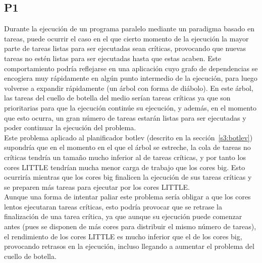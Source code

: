 \subsection{P1}
Durante la ejecución de un programa paralelo mediante un paradigma basado
en tareas, puede ocurrir el caso en el que cierto momento de la ejecución
la mayor parte de tareas listas para ser ejecutadas sean críticas,
provocando que nuevas tareas no estén listas para ser ejecutadas hasta que
estas acaben. Este comportamiento podría reflejarse en una aplicación cuyo
grafo de dependencias se encogiera muy rápidamente en algún punto
intermedio de la ejecución, para luego volverse a expandir rápidamente (un
árbol con forma de diábolo). En este árbol, las tareas del cuello de
botella del medio serían tareas críticas ya que son prioritarias para que
la ejecución continúe su ejecución, y además, en el momento que esto
ocurra, un gran número de tareas estarán listas para ser ejecutadas y
poder continuar la ejecución del problema.\\
Este problema aplicado al planificador botlev (descrito en la
sección~\ref{s3:botlev}) supondría que en el momento en el que el árbol se
estreche, la cola de tareas no críticas tendría un tamaño mucho inferior al
de tareas críticas, y por tanto los cores LITTLE tendrían mucha menor carga
de trabajo que los cores big. Esto ocurriría mientras que los cores big
finalicen la ejecución de sus tareas críticas y se preparen más tareas para
ejecutar por los cores LITTLE.\\
Aunque una forma de intentar paliar este problema sería obligar a que los
cores lentos ejecutaran tareas críticas, esto podría provocar que se
retrase la finalización de una tarea crítica, ya que aunque su ejecución
puede comenzar antes (pues se disponen de más cores para distribuir el
mismo número de tareas), el rendimiento de los cores LITTLE es mucho
inferior que el de los cores big, provocando retrasos en la ejecución,
incluso llegando a aumentar el problema del cuello de botella.

